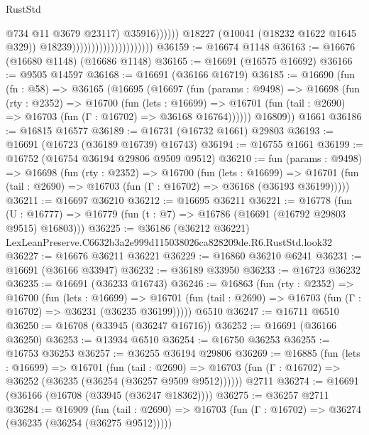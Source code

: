 \begin{lexlean}{RustStd}
\begin{coremodule}
                                                            @734
                                                            @11
                                                            @3679
                                                            @23117)
                                                          @35916))))))
                                              @18227
                                              (@10041 (@18232 @1622 @1645 @329))
                                              @18239)))))))))))))))))))))
@36159 := @16674 @1148
@36163 := @16676 (@16680 @1148) (@16686 @1148)
@36165 := @16691 (@16575 @16692)
@36166 := @9505 @14597
@36168 := @16691 (@36166 @16719)
@36185 := @16690
    (fun (fn : @58) =>
    @36165
      (@16695
        (@16697
          (fun (params : @9498) =>
          @16698
            (fun (rty : @2352) =>
            @16700
              (fun (lets : @16699) =>
              @16701 (fun (tail : @2690) => @16703 (fun (Γ : @16702) => @36168 @16764))))))
        @16809))
    @1661
@36186 := @16815 @16577
@36189 := @16731 (@16732 @1661) @29803
@36193 := @16691 (@16723 (@36189 @16739) @16743)
@36194 := @16755 @1661
@36199 := @16752 (@16754 @36194 @29806 @9509 @9512)
@36210 := fun (params : @9498) =>
  @16698
    (fun (rty : @2352) =>
    @16700
      (fun (lets : @16699) =>
      @16701 (fun (tail : @2690) => @16703 (fun (Γ : @16702) => @36168 (@36193 @36199)))))
@36211 := @16697 @36210
@36212 := @16695 @36211
@36221 := @16778
    (fun (U : @16777) => @16779 (fun (t : @7) => @16786 (@16691 (@16792 @29803 @9515) @16803)))
@36225 := @36186 (@36212 @36221) LexLeanPreserve.C6632b3a2e999d115038026ca828209de.R6.RustStd.look32
@36227 := @16676 @36211 @36221
@36229 := @16860 @36210 @6241
@36231 := @16691 (@36166 @33947)
@36232 := @36189 @33950
@36233 := @16723 @36232
@36235 := @16691 (@36233 @16743)
@36246 := @16863
    (fun (rty : @2352) =>
    @16700
      (fun (lets : @16699) =>
      @16701 (fun (tail : @2690) => @16703 (fun (Γ : @16702) => @36231 (@36235 @36199)))))
    @6510
@36247 := @16711 @6510
@36250 := @16708 (@33945 (@36247 @16716))
@36252 := @16691 (@36166 @36250)
@36253 := @13934 @6510
@36254 := @16750 @36253
@36255 := @16753 @36253
@36257 := @36255 @36194 @29806
@36269 := @16885
    (fun (lets : @16699) =>
    @16701
      (fun (tail : @2690) =>
      @16703 (fun (Γ : @16702) => @36252 (@36235 (@36254 (@36257 @9509 @9512))))))
    @2711
@36274 := @16691 (@36166 (@16708 (@33945 (@36247 @18362))))
@36275 := @36257 @2711
@36284 := @16909
    (fun (tail : @2690) => @16703 (fun (Γ : @16702) => @36274 (@36235 (@36254 (@36275 @9512)))))

\end{coremodule}
\end{lexlean}
